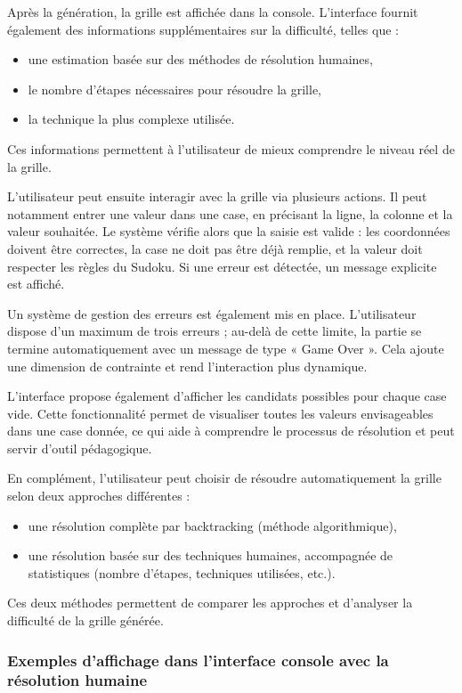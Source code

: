 \documentclass[a4paper]{article}
\begin{document}
Après la génération, la grille est affichée dans la console. L’interface fournit également des informations supplémentaires sur la difficulté, telles que :
\begin{itemize}
    \item une estimation basée sur des méthodes de résolution humaines,
    \item le nombre d’étapes nécessaires pour résoudre la grille,
    \item la technique la plus complexe utilisée.
\end{itemize}

Ces informations permettent à l’utilisateur de mieux comprendre le niveau réel de la grille.

L’utilisateur peut ensuite interagir avec la grille via plusieurs actions. Il peut notamment entrer une valeur dans une case, en précisant la ligne, la colonne et la valeur souhaitée. Le système vérifie alors que la saisie est valide : les coordonnées doivent être correctes, la case ne doit pas être déjà remplie, et la valeur doit respecter les règles du Sudoku. Si une erreur est détectée, un message explicite est affiché.

Un système de gestion des erreurs est également mis en place. L’utilisateur dispose d’un maximum de trois erreurs ; au-delà de cette limite, la partie se termine automatiquement avec un message de type « Game Over ». Cela ajoute une dimension de contrainte et rend l’interaction plus dynamique.

L’interface propose également d’afficher les candidats possibles pour chaque case vide. Cette fonctionnalité permet de visualiser toutes les valeurs envisageables dans une case donnée, ce qui aide à comprendre le processus de résolution et peut servir d’outil pédagogique.

En complément, l’utilisateur peut choisir de résoudre automatiquement la grille selon deux approches différentes :
\begin{itemize}
    \item une résolution complète par backtracking (méthode algorithmique),
    \item une résolution basée sur des techniques humaines, accompagnée de statistiques (nombre d’étapes, techniques utilisées, etc.).
\end{itemize}

Ces deux méthodes permettent de comparer les approches et d’analyser la difficulté de la grille générée. 

\subsubsection{Exemples d'affichage dans l'interface console avec la résolution humaine}
\end{document}
